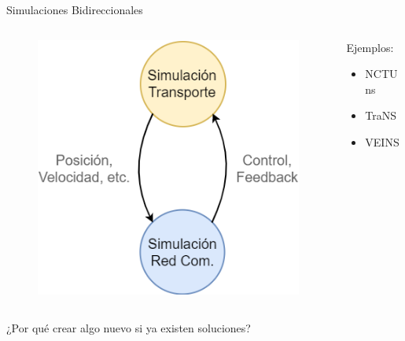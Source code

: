 \documentclass[aspectratio=169]{beamer}
\begin{document}
\begin{frame}{Simulaciones Bidireccionales}
\begin{columns}
    \begin{column}{.5\linewidth}
        \begin{figure}[p]
            \centering
            \includegraphics[width=\textwidth]{figuras/BidirectionalSim.png}
        \end{figure}
    \end{column}
    \begin{column}{.3\linewidth}
        Ejemplos:
        \begin{itemize}
            \item NCTUns \autocite{nctuns6}
            \item TraNS \autocite{piorkowski2008trans}
            \item VEINS \autocite{sommer_german_dressler}
        \end{itemize}        
    \end{column}
\end{columns}
\end{frame}

\begin{frame}[standout]
¿Por qué crear algo nuevo si ya existen soluciones?
\end{frame}
\end{document}
